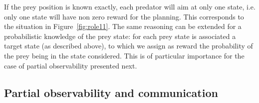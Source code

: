 
If the prey position is known exactly, each predator will aim at only one state, i.e. only one state will have non zero reward for the planning. This corresponds to the situation in Figure~\ref{fig:role11}. The same reasoning can be extended for a probabilistic knowledge of the prey state: for each prey state is associated a target state (as described above), to which we assign as reward the probability of the prey being in the state considered. This is of particular importance for the case of partial observability presented next.

\subsection{Partial observability and communication}
\label{sec:com}

